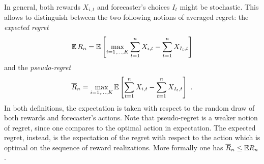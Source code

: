 In general, both rewards $X_{i,t}$ and forecaster's choices $I_t$ might be stochastic. This allows to distinguish between the two following notions of averaged regret: the \textsl{expected regret}
\begin{equation} \label{eq:exp-regret}
    \mathbb{E}\,R_n = \mathbb{E}\left[\max_{i=1,\hdots,K} \sum_{t=1}^n X_{i,t} - \sum_{t=1}^n X_{I_t,t}\right]
\end{equation}
and the \textsl{pseudo-regret}
%
\begin{equation} \label{eq:pseudoregret}
\overline{R}_n = \max_{i=1,\dots,K} \mathbb{E}\left[ \sum_{t=1}^n X_{i,t} - \sum_{t=1}^n X_{I_t,t}\right]~.
\end{equation}
%
In both definitions, the expectation is taken with respect to the random draw of both rewards and forecaster's actions. Note that pseudo-regret is a weaker notion of regret, since one compares to the optimal action in expectation. The expected regret, instead, is the expectation of the regret with respect to the action which is optimal on the sequence of reward realizations. More formally one has $\overline{R}_n \leq \mathbb{E} R_n$. 


